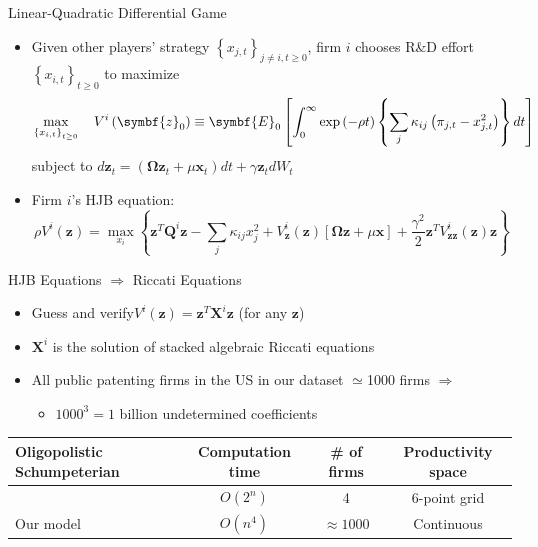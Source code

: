 \documentclass[
  aspectratio=169,  %
  handout           %
]{beamer}
\theoremstyle{plain}
\begin{document}
\begin{frame}{Linear-Quadratic Differential Game}

  \vspace{-1mm}

  \begin{itemize}
    \item Given other players' strategy $\left\{ x_{j,t}\right\} _{j\neq i,t\geq0}$,
          firm $i$ chooses R\&D effort $\left\{ x_{i,t}\right\} _{t\geq0}$
          to maximize
          \[
            \max_{\left\{ x_{i,t}\right\} _{t\geq0}}\quad V^{i}\left(\text{\ensuremath{\symbf{z}}}_{0}\right)\equiv\symbf{E}_{0}\left[\int_{0}^{\infty}\exp\left(-\rho t\right)\left\{ \sum_{j}\kappa_{ij}\left(\pi_{j,t}-x_{j,t}^{2}\right)\right\} dt\right]
          \]
          subject to $d\symbf{z}_{t}=\left(\symbf{\Omega}\symbf{z}_{t}+\mu\symbf{x}_{t}\right)dt+\gamma\symbf{z}_{t}dW_{t}$\medskip{}
    \item Firm $i$'s HJB equation:
          \[
            \rho V^{i}\left(\symbf{z}\right)=\max_{x_{i}}\left\{ \symbf{z}^{T}\symbf{Q}^{i}\symbf{z}-\sum_{j}\kappa_{ij}x_{j}^{2}+V_{\symbf{z}}^{i}\left(\symbf{z}\right)\left[\symbf{\Omega}\symbf{z}+\mu\symbf{x}\right]+\frac{\gamma^{2}}{2}\symbf{z}^{T}V_{\symbf{zz}}^{i}\left(\symbf{z}\right)\symbf{z}\right\}
          \]
  \end{itemize}
\end{frame}
%
\begin{frame}{HJB Equations $\Longrightarrow$ Riccati Equations}

  \label{hjb}
  \begin{itemize}
    \item Guess and verify$V^{i}\left(\symbf{z}\right)=\symbf{z}^{T}\symbf{X}^{i}\symbf{z}$
          (for any $\symbf{z}$)
    \item $\symbf{X}^{i}$ is the solution of stacked algebraic Riccati equations \hyperlink{riccati}{}
    \item All public patenting firms in the US in our dataset $\simeq$1000
          firms $\Longrightarrow$
          \begin{itemize}
            \item $1000^{3}=1$ billion undetermined coefficients\medskip{}
          \end{itemize}
  \end{itemize}
  \begin{center}
    \begin{tabular}{@{}p{5cm}ccc@{}}
      \toprule
      Oligopolistic Schumpeterian                                       & Computation time & \# of firms    & Productivity space \\
      \midrule
      \citet{Cavenaile2023-lo}                    & $O(2^n)$         & 4              & 6-point grid       \\
      Our model                                   & $O(n^4)$         & $\approx1000$  & Continuous         \\
      \bottomrule
    \end{tabular}
  \end{center}

\end{frame}
\end{document}
